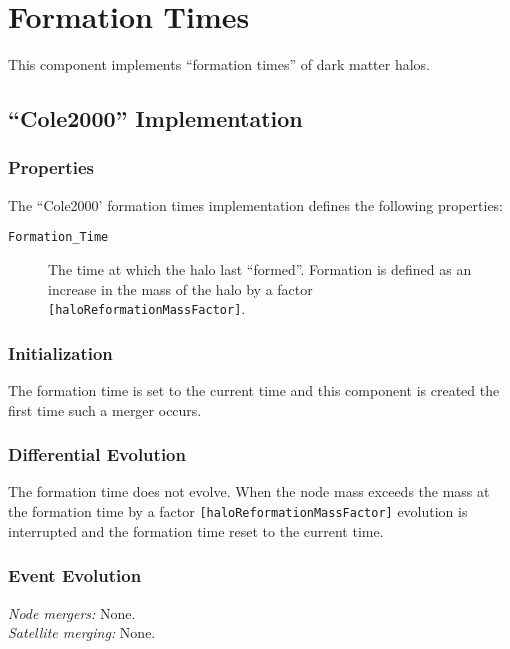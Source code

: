 \section{Formation Times}\label{sec:ComponentFormationTimes}

This \gls{component} implements ``formation times'' of dark matter halos.

\subsection{``Cole2000'' Implementation}

\subsubsection{Properties}

The ``Cole2000' formation times implementation defines the following properties:
\begin{description}
 \item [{\tt Formation\_Time}] The time at which the halo last ``formed''. Formation is defined as an increase in the mass of the halo by a factor {\tt [haloReformationMassFactor]}.
\end{description}

\subsubsection{Initialization}

The formation time is set to the current time and this \gls{component} is created the first time such a merger occurs.

\subsubsection{Differential Evolution}

The formation time does not evolve. When the \gls{node} mass exceeds the mass at the formation time by a factor {\tt [haloReformationMassFactor]} evolution is interrupted and the formation time reset to the current time.

\subsubsection{Event Evolution}

\noindent\emph{Node mergers:} None.\\

\noindent\emph{Satellite merging:} None.\\

